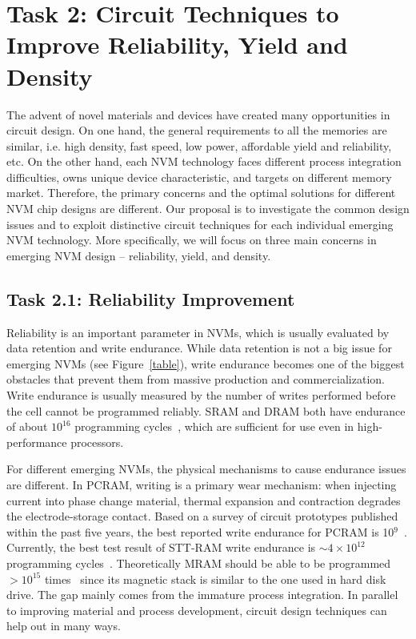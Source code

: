 
\section{Task 2: Circuit Techniques to Improve Reliability, Yield and Density}
The advent of novel materials and devices have created many opportunities in circuit design. On one hand, the general requirements to all the memories are similar, i.e. high density, fast speed, low power, affordable yield and reliability, etc. On the other hand, each NVM technology faces different process integration difficulties, owns unique device characteristic, and targets on different memory market. Therefore, the primary concerns and the optimal solutions for different NVM chip designs are different. Our proposal is to investigate the common design issues and to exploit distinctive circuit techniques for each individual emerging NVM technology. More specifically, we will focus on three main concerns in emerging NVM design -- reliability, yield, and density.

\subsection{Task 2.1: Reliability Improvement}
Reliability is an important parameter in NVMs, which is usually evaluated by data retention and write endurance. While data retention is not a big issue for emerging NVMs (see Figure~\ref{table}), write endurance becomes one of the biggest obstacles that prevent them from massive production and commercialization. Write endurance is usually measured by the number of writes performed before the cell cannot be programmed reliably. SRAM and DRAM both have endurance of about $10^{16}$ programming cycles~\cite{ITRS07}, which are sufficient for use even in high-performance processors.

For different emerging NVMs, the physical mechanisms to cause endurance issues are different. In PCRAM, writing is a primary wear mechanism: when injecting current into phase change material, thermal expansion and contraction degrades the electrode-storage contact. Based on a survey of circuit prototypes published within the past five years, the best reported write endurance for PCRAM is 10$^9$~\cite{Lee09}. Currently, the best test result of STT-RAM write endurance is $\sim4\times10^{12}$ programming cycles~\cite{Diao07}. Theoretically MRAM should be able to be programmed $>10^{15}$ times~\cite{ITRS07} since its magnetic stack is similar to the one used in hard disk drive. The gap mainly comes from the immature process integration. In parallel to improving material and process development, circuit design techniques can help out in many ways.

